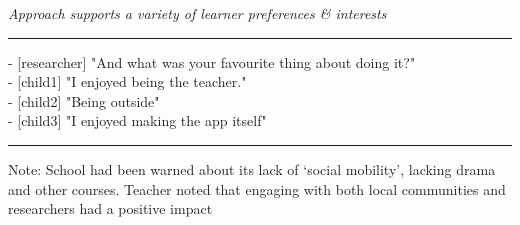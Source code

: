 \textit{Approach supports a variety of learner preferences \& interests}

\par\noindent\rule{\textwidth}{1pt}

- [researcher] "And what was your favourite thing about doing it?"\\
- [child1] "I enjoyed being the teacher."\\
- [child2] "Being outside"\\
- [child3] "I enjoyed making the app itself"

{\centering
  \noindent\rule{0.5\textwidth}{0.4pt}\par
}

Note: School had been warned about its lack of ‘social mobility’, lacking drama and other courses. Teacher noted that engaging with both local communities and researchers had a positive impact
